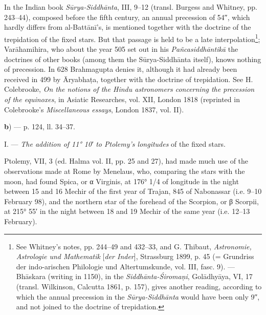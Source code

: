 \documentclass[11pt]{article}
\begin{document}
\par In the Indian book \emph{Sūrya-Siddhānta}, III, 9–12 (transl. Burgess and Whitney, pp. 243–44), composed before the fifth century, an annual precession of 54″, which hardly differs from al-Battānī's, is mentioned together with the doctrine of the trepidation of the fixed stars. But that passage is held to be a late interpolation\footnote{See Whitney's notes, pp. 244–49 and 432–33, and G. Thibaut, \emph{Astronomie, Astrologie und Mathematik} [\emph{der Inder}], Strassburg 1899, p. 45 (= Grundriss der indo-arischen Philologie und Altertumskunde, vol. III, fasc. 9). — Bhāskara (writing in 1150), in the \emph{Siddhānta-Śiromaṇi}, Golādhyāya, VI, 17 (transl. Wilkinson, Calcutta 1861, p. 157), gives another reading, according to which the annual precession in the \emph{Sūrya-Siddhānta} would have been only 9″, and not joined to the doctrine of trepidation.}; Varāhamihira, who about the year 505 set out in his \emph{Pañcasiddhāntikā} the doctrines of other books (among them the Sūrya-Siddhānta itself), knows nothing of precession. In 628 Brahmagupta denies it, although it had already been received in 499 by Āryabhaṭa, together with the doctrine of trepidation. See H. Colebrooke, \emph{On the notions of the Hindu astronomers concerning the precession of the equinoxes}, in Asiatic Researches, vol. XII, London 1818 (reprinted in Colebrooke's \emph{Miscellaneous essays}, London 1837, vol. II).\par
\par\begin{center}\textbf{b}) — p. 124, ll. 34–37.\end{center}
\par I. — \emph{The addition of 11° 10′ to Ptolemy's longitudes} of the fixed stars.\par
\par Ptolemy, VII, 3 (ed. Halma vol. II, pp. 25 and 27), had made much use of the observations made at Rome by Menelaus, who, comparing the stars with the moon, had found Spica, or {\greekfont α} Virginis, at 176° 1/4 of longitude in the night between 15 and 16 Mechir of the first year of Trajan, 845 of Nabonassar (i.e. 9–10 February 98), and the northern star of the forehead of the Scorpion, or {\greekfont β} Scorpii, at 215° 55′ in the night between 18 and 19 Mechir of the same year (i.e. 12–13 February).\par
\end{document}
